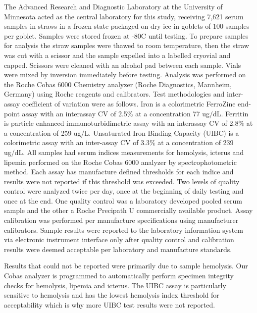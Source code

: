 \documentclass[
]{article}
\begin{document}
The Advanced Research and Diagnostic Laboratory at the University of
Minnesota acted as the central laboratory for this study, receiving
7,621 serum samples in straws in a frozen state packaged on dry ice in
goblets of 100 samples per goblet. Samples were stored frozen at -80C
until testing. To prepare samples for analysis the straw samples were
thawed to room temperature, then the straw was cut with a scissor and
the sample expelled into a labelled cryovial and capped. Scissors were
cleaned with an alcohol pad between each sample. Vials were mixed by
inversion immediately before testing. Analysis was performed on the
Roche Cobas 6000 Chemistry analyzer (Roche Diagnostics, Mannheim,
Germany) using Roche reagents and calibrators. Test methodologies and
inter-assay coefficient of variation were as follows. Iron is a
colorimetric FerroZine end-point assay with an interassay CV of 2.5\% at
a concentration 77 ug/dL. Ferritin is particle enhanced
immunoturbidimetric assay with an interassay CV of 2.8\% at a
concentration of 259 ug/L. Unsaturated Iron Binding Capacity (UIBC) is a
colorimetric assay with an inter-assay CV of 3.3\% at a concentration of
239 ug/dL. All samples had serum indices measurements for hemolysis,
icterus and lipemia performed on the Roche Cobas 6000 analyzer by
spectrophotometric method. Each assay has manufacture defined thresholds
for each indice and results were not reported if this threshold was
exceeded. Two levels of quality control were analyzed twice per day,
once at the beginning of daily testing and once at the end. One quality
control was a laboratory developed pooled serum sample and the other a
Roche Precipath U commercially available product. Assay calibration was
performed per manufacture specifications using manufacturer calibrators.
Sample results were reported to the laboratory information system via
electronic instrument interface only after quality control and
calibration results were deemed acceptable per laboratory and
manufacture standards.

Results that could not be reported were primarily due to sample
hemolysis. Our Cobas analyzer is programmed to automatically perform
specimen integrity checks for hemolysis, lipemia and icterus. The UIBC
assay is particularly sensitive to hemolysis and has the lowest
hemolysis index threshold for acceptability which is why more UIBC test
results were not reported.
\end{document}
